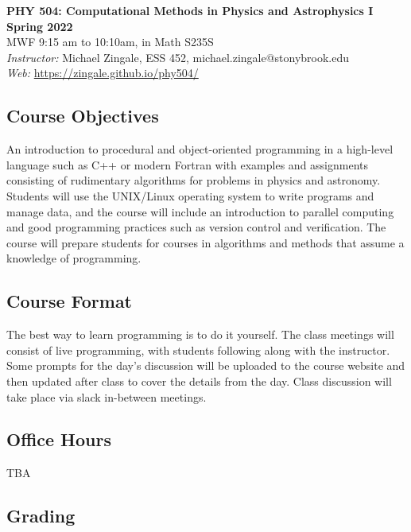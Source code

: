 \documentclass[10pt]{article}
\begin{document}
\begin{center}
{\LARGE \sffamily \bfseries PHY 504: Computational Methods in Physics and Astrophysics I} \\[1mm]
{\bfseries Spring 2022} \\
MWF 9:15 am to 10:10am, in Math S235S\\
{\em  Instructor:} Michael Zingale, ESS 452, michael.zingale@stonybrook.edu \\
{\em Web:}\/ \url{https://zingale.github.io/phy504/}
\end{center}



\subsection*{Course Objectives}

\noindent An introduction to procedural and object-oriented
programming in a high-level language such as C++ or modern Fortran
with examples and assignments consisting of rudimentary algorithms for
problems in physics and astronomy. Students will use the UNIX/Linux
operating system to write programs and manage data, and the course
will include an introduction to parallel computing and good
programming practices such as version control and verification. The
course will prepare students for courses in algorithms and methods
that assume a knowledge of programming.

\subsection*{Course Format}

The best way to learn programming is to do it yourself.  The class
meetings will consist of live programming, with students following
along with the instructor.  Some prompts for the day's discussion will
be uploaded to the course website and then updated after class to
cover the details from the day.  Class discussion will take place via
slack in-between meetings.

\subsection*{Office Hours}

\noindent TBA


\subsection*{Grading}
\end{document}
